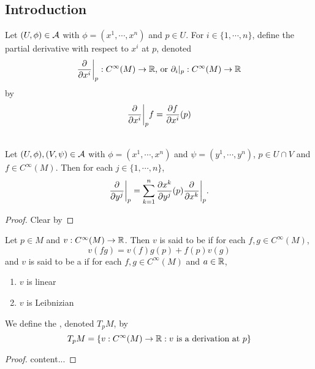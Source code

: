\documentclass{book}
\begin{document}
	\subsection{Introduction}

	\begin{defn}
		Let $(U, \phi) \in \mathcal{A}$ with $\phi = (x^1, \cdots, x^n)$ and $p \in U$. For $i \in \{1, \cdots, n\}$, define the partial derivative with respect to $x^i$ at $p$, denoted $$\frac{\partial}{\partial x^i} \bigg|_p: C^{\infty}(M) \rightarrow \mathbb{R}  \text{, or } \partial_i|_p: C^{\infty}(M) \rightarrow \mathbb{R} $$ by $$ \frac{\partial}{\partial x^i} \bigg |_p  f =  \frac{\partial f}{\partial x^i}(p) $$
	\end{defn}

	\begin{ex} \\
		Let $(U, \phi), (V, \psi) \in \mathcal{A}$ with $\phi = (x^1, \cdots, x^n)$ and $\psi = (y^1, \cdots, y^n)$, $p \in U \cap V$ and $f \in C^{\infty}(M)$. Then for each $j \in \{1, \cdots, n\}$, 
		$$\frac{\partial}{\partial y^j} \bigg|_p = \sum_{k =1}^n \frac{\partial x^k}{\partial y^j} (p) \frac{\partial}{\partial x^k} \bigg|_p.$$
	\end{ex}
	
	\begin{proof}
		Clear by 
	\end{proof}

	\begin{defn}
		Let $p \in M$ and $v: C^{\infty}(M) \rightarrow \mathbb{R}$. Then $v$ is said to be  if for each $f,g \in  C^{\infty}(M)$, $$v(fg) = v(f)g(p) + f(p)v(g)$$ and $v$ is said to be a  if for each $f, g \in C^{\infty}(M)$ and $a \in \mathbb{R}$,
		\begin{enumerate}
			\item $v$ is linear 
			\item $v$ is Leibnizian
		\end{enumerate}
		We define the , denoted $T_pM$, by $$T_pM = \{ v: C^{\infty}(M) \rightarrow \mathbb{R}: v \text{ is a derivation at }p\}$$
	\end{defn}

	\begin{ex}
	\end{ex}

	\begin{proof}
		content...
	\end{proof}
\end{document}
